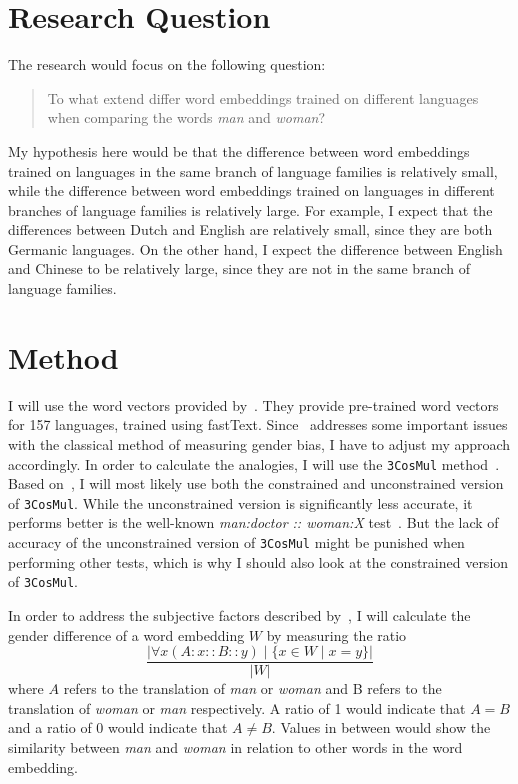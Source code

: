 \documentclass[english, a4paper, 11pt]{article}
\begin{document}
\section*{Research Question}
The research would focus on the following question:

\begin{quote}
    To what extend differ word embeddings trained on different languages when comparing
    the words \textit{man} and \textit{woman}?
\end{quote}

My hypothesis here would be that the difference between word embeddings
trained on languages in the same branch of language families is relatively small, while
the difference between word embeddings trained on languages in different branches of
language families is relatively large.
For example, I expect that the differences between Dutch and English are
relatively small, since they are both Germanic languages. On the other hand, I expect the
difference between English and Chinese to be relatively large, since they are not in the
same branch of language families.

\section*{Method}
I will use the word vectors provided by~\cite{grave2018learning}. They provide
pre-trained word vectors for 157 languages, trained using fastText.
Since~\cite{2019arXiv190509866N} addresses some important issues with the classical method
of measuring gender bias, I have to adjust my approach accordingly.
In order to calculate the analogies, I will use the \texttt{3CosMul}
method~\cite{Levy14linguisticregularities}. Based on~\cite{2019arXiv190509866N},
I will most likely use both the constrained and unconstrained version of \texttt{3CosMul}.
While the unconstrained version is significantly less accurate, it performs better is the
well-known \textit{man:doctor :: woman:X} test~\cite{2019arXiv190509866N}.
But the lack of accuracy of the unconstrained version of \texttt{3CosMul} might be
punished when performing other tests, which is why I should also look at the constrained
version of \texttt{3CosMul}.

In order to address the subjective factors described by~\cite{2019arXiv190509866N}, I
will calculate the gender difference of a word embedding $W$ by measuring the ratio
$$
\frac{ |\forall x (A : x :: B :: y) \mid \{x \in W \mid x = y\}| } { |W| }
$$
where $A$ refers to the translation of \textit{man} or \textit{woman} and B refers to the translation of \textit{woman} or \textit{man} respectively.
A ratio of 1 would indicate that $A = B$ and a ratio of 0 would indicate that $A \neq B$.
Values in between would show the similarity between \textit{man} and \textit{woman} in relation to other words in the word embedding.
\end{document}
